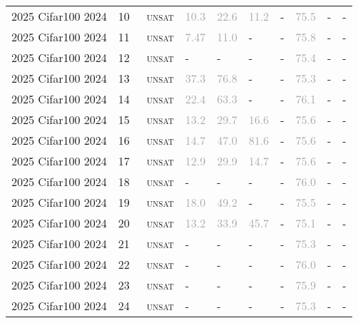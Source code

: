 \begin{center}
{\begin{longtable}{@{}llllllllll@{}}
2025 Cifar100 2024 & 10 & ~\textsc{unsat} & \textcolor{darkgray}{10.3} & \textcolor{darkgray}{22.6} & \textcolor{darkgray}{11.2} & - & \textcolor{darkgray}{75.5} & - & - \\
2025 Cifar100 2024 & 11 & ~\textsc{unsat} & \textcolor{darkgray}{7.47} & \textcolor{darkgray}{11.0} & - & - & \textcolor{darkgray}{75.8} & - & - \\
2025 Cifar100 2024 & 12 & ~\textsc{unsat} & - & - & - & - & \textcolor{darkgray}{75.4} & - & - \\
2025 Cifar100 2024 & 13 & ~\textsc{unsat} & \textcolor{darkgray}{37.3} & \textcolor{darkgray}{76.8} & - & - & \textcolor{darkgray}{75.3} & - & - \\
2025 Cifar100 2024 & 14 & ~\textsc{unsat} & \textcolor{darkgray}{22.4} & \textcolor{darkgray}{63.3} & - & - & \textcolor{darkgray}{76.1} & - & - \\
2025 Cifar100 2024 & 15 & ~\textsc{unsat} & \textcolor{darkgray}{13.2} & \textcolor{darkgray}{29.7} & \textcolor{darkgray}{16.6} & - & \textcolor{darkgray}{75.6} & - & - \\
2025 Cifar100 2024 & 16 & ~\textsc{unsat} & \textcolor{darkgray}{14.7} & \textcolor{darkgray}{47.0} & \textcolor{darkgray}{81.6} & - & \textcolor{darkgray}{75.6} & - & - \\
2025 Cifar100 2024 & 17 & ~\textsc{unsat} & \textcolor{darkgray}{12.9} & \textcolor{darkgray}{29.9} & \textcolor{darkgray}{14.7} & - & \textcolor{darkgray}{75.6} & - & - \\
2025 Cifar100 2024 & 18 & ~\textsc{unsat} & - & - & - & - & \textcolor{darkgray}{76.0} & - & - \\
2025 Cifar100 2024 & 19 & ~\textsc{unsat} & \textcolor{darkgray}{18.0} & \textcolor{darkgray}{49.2} & - & - & \textcolor{darkgray}{75.5} & - & - \\
2025 Cifar100 2024 & 20 & ~\textsc{unsat} & \textcolor{darkgray}{13.2} & \textcolor{darkgray}{33.9} & \textcolor{darkgray}{45.7} & - & \textcolor{darkgray}{75.1} & - & - \\
2025 Cifar100 2024 & 21 & ~\textsc{unsat} & - & - & - & - & \textcolor{darkgray}{75.3} & - & - \\
2025 Cifar100 2024 & 22 & ~\textsc{unsat} & - & - & - & - & \textcolor{darkgray}{76.0} & - & - \\
2025 Cifar100 2024 & 23 & ~\textsc{unsat} & - & - & - & - & \textcolor{darkgray}{75.9} & - & - \\
2025 Cifar100 2024 & 24 & ~\textsc{unsat} & - & - & - & - & \textcolor{darkgray}{75.3} & - & - \\

\end{longtable}}
\end{center}
